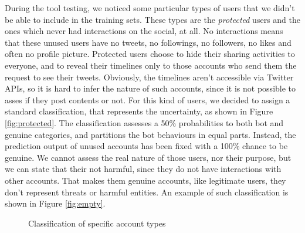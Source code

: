 During the tool testing, we noticed some particular types of users that we didn't be able to include in the training sets. These types are the \textit{protected} users and the ones which never had interactions on the social, at all. No interactions means that these unused users have no tweets, no followings, no followers, no likes and often no profile picture.
Protected users choose to hide their sharing activities to everyone, and to reveal their timelines only to those accounts who send them the request to see their tweets. Obviously, the timelines aren't accessible via Twitter APIs, so it is hard to infer the nature of such accounts, since it is not possible to asses if they post contents or not. For this kind of users, we decided to assign a standard classification, that represents the uncertainty, as shown in Figure \ref{fig:protected}. The classification assesses a 50\% probabilities to both bot and genuine categories, and partitions the bot behaviours in equal parts.
Instead, the prediction output of unused accounts has been fixed with a 100\% chance to be genuine. We cannot assess the real nature of those users, nor their purpose, but we can state that their not harmful, since they do not have interactions with other accounts. That makes them genuine accounts, like legitimate users, they don't represent threats or harmful entities. An example of such classification is shown in Figure \ref{fig:empty}.

\begin{figure}[htp!]
	\centering 
	\caption{Classification of specific account types}
\end{figure}
